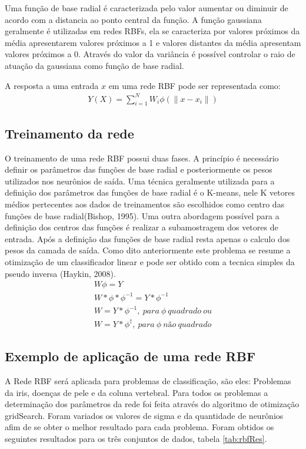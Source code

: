 \documentclass[
	article,			%
	11pt,				%
	oneside,			%
	a4paper,			%
	english,			%
	brazil,				%
	sumario=tradicional
	]{abntex2}
\begin{document}
Uma função de base radial é caracterizada pelo valor aumentar ou
diminuir de acordo com a distancia ao ponto central da função. A função
gaussiana geralmente é utilizadas em redes RBFs, ela se caracteriza por valores
próximos da média apresentarem valores próximos a 1 e valores distantes da média
apresentam valores próximos a 0. Através do valor da variância é
possível controlar o raio de atuação da gaussiana como função de base
radial.

A resposta a uma entrada $x$ em uma rede RBF pode ser representada como:
\begin{align}
Y(X)=\sum^{N}_{i=1}W_i\phi(\|x-x_i\|)
\end{align}

\subsection{Treinamento da rede}
O treinamento de uma rede RBF possui duas fases. A princípio é necessário
definir os parâmetros das funções de base radial e posteriormente os pesos
utilizados nos neurônios de saída. Uma técnica geralmente utilizada para a
definição dos parâmetros das funções de base radial é o K-means, nele K
vetores médios pertecentes aos dados de treinamentos são escolhidos como centro
das funções de base radial(Bishop, 1995). Uma outra abordagem possível para a
definição dos centros das funções é realizar a subamostragem dos vetores de
entrada. Após a definição das funções de base radial resta apenas o calculo dos
pesos da camada de saída. Como dito anteriormente este problema se resume a
otimização de um classificador linear e pode ser obtido com a tecnica simples
da pseudo inversa (Haykin, 2008).
\begin{align}
W\phi=Y \\
W*\phi*\phi^{-1}=Y*\phi^{-1}\\
W=Y*\phi^{-1},\ para\ \phi\ quadrado\ ou \\
W=Y*\phi^{\dagger},\ para\ \phi\ não\ quadrado
\end{align}

\subsection{Exemplo de aplicação de uma rede RBF}
A Rede RBF será aplicada para problemas de classificação, são eles:
Problemas da iris, doenças de pele e da coluna vertebral. Para todos os
problemas a determinação dos parâmetros da rede foi feita através do algoritmo
de otimização gridSearch. Foram variados os valores de sigma e da quantidade de
neurônios afim de se obter o melhor resultado para cada problema.
Foram obtidos os seguintes resultados para os três conjuntos de dados, tabela
\ref{tab:rbfRes}.
\end{document}
